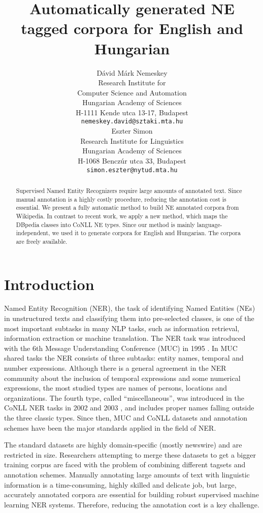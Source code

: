 \documentclass[11pt]{article}
\title{Automatically generated NE tagged corpora for English and Hungarian}
\author{Dávid Márk Nemeskey \\
  Research Institute for \\ Computer Science and Automation \\
  Hungarian Academy of Sciences \\
  H-1111 Kende utca 13-17, Budapest \\
  {\tt nemeskey.david@sztaki.mta.hu} \\\And
  Eszter Simon \\
  Research Institute for Linguistics \\
  Hungarian Academy of Sciences \\
  H-1068 Benczúr utca 33, Budapest \\
  {\tt simon.eszter@nytud.mta.hu} \\}
\date{}
\begin{document}
\maketitle
\begin{abstract}

Supervised Named Entity Recognizers require large amounts of annotated
text. Since manual annotation is a highly costly procedure, reducing the
annotation cost is essential. We present a fully automatic method to build NE
annotated corpora from Wikipedia. In contrast to recent work, we apply a new
method, which maps the DBpedia classes into CoNLL NE types. Since our method
is mainly language-independent, we used it to generate corpora for English
and Hungarian. The corpora are freely available.

\end{abstract}

\section{Introduction}
\label{sec:intro}

Named Entity Recognition (NER), the task of identifying Named Entities (NEs) in unstructured texts and classifying them into pre-selected classes, is one of the most important subtasks in many NLP tasks, such as information retrieval, information extraction or machine translation. The NER task was introduced with the 6th Message Understanding Conference (MUC) in 1995 \cite{Grishman:96}. In MUC shared tasks the NER consists of three subtasks: entity names, temporal and number expressions. Although there is a general agreement in the NER community about the inclusion of temporal expressions and some numerical expressions, the most studied types are names of persons, locations and organizations. The fourth type, called ``miscellaneous'', was introduced in the CoNLL NER tasks in 2002 \cite{Tjong:02} and 2003 \cite{Tjong:03}, and includes proper names falling outside the three classic types. Since then, MUC and CoNLL datasets and annotation schemes have been the major standards applied in the field of NER. 

The standard datasets are highly domain-specific (mostly newswire) and are
restricted in size. Researchers attempting to merge these datasets to get a bigger training corpus are faced with the
problem of combining different tagsets and annotation schemes. Manually
annotating large amounts of text with linguistic information is a
time-consuming, highly skilled and delicate job, but large, accurately
annotated corpora are essential for building robust supervised machine
learning NER systems. Therefore, reducing the annotation cost is a key
challenge.
\end{document}
